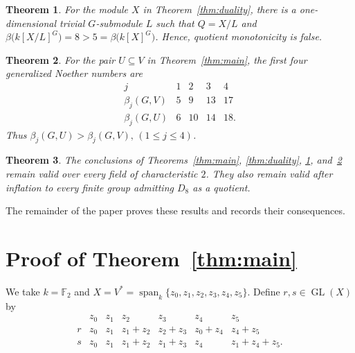 \documentclass[11pt]{article}
\newtheorem{theorem}{Theorem}[section]
\theoremstyle{definition}
\newcommand{\F}{\mathbb F}
\newcommand{\GL}{\operatorname{GL}}
\newcommand{\Span}{\operatorname{span}}
\begin{document}
	\begin{theorem}\label{thm:quotient}
		For the module $X$ in Theorem~\ref{thm:duality}, there is a one-dimensional trivial $G$-submodule $L$ such that $Q=X/L$ and $\beta\bigl(k[X/L]^G\bigr)=8>5=\beta\bigl(k[X]^G\bigr)$. Hence, quotient monotonicity is false.
	\end{theorem}

	\begin{theorem}\label{thm:generalized}
		For the pair $U\subseteq V$ in Theorem~\ref{thm:main}, the first four generalized Noether numbers are
		\[
		\begin{array}{c|cccc}
			j&1&2&3&4\\ \hline
			\beta_j(G,V)&5&9&13&17\\
			\beta_j(G,U)&6&10&14&18.
		\end{array}
		\]
		Thus $\beta_j(G,U)>\beta_j(G,V), \, (1\leq j\leq4)$.
	\end{theorem}

	\begin{theorem}\label{thm:inflation}
		The conclusions of Theorems~\ref{thm:main}, \ref{thm:duality}, \ref{thm:quotient}, and~\ref{thm:generalized} remain valid over every field of characteristic $2$. They also remain valid after inflation to every finite group admitting $D_8$ as a quotient.
	\end{theorem}

	The remainder of the paper proves these results and records their consequences.

	\section{Proof of Theorem~\ref{thm:main}}
	
	We take $k=\F_2$ and $X=V^*=\Span_k\{z_0,z_1,z_2,z_3,z_4,z_5\}$. Define $r,s\in\GL(X)$ by
	\begin{equation}\label{eq:X-action-table}
		\begin{array}{c|cccccc}
			&z_0&z_1&z_2&z_3&z_4&z_5\\ \hline
			r&z_0&z_1&z_1+z_2&z_2+z_3&z_0+z_4&z_4+z_5\\[1mm]
			s&z_0&z_1&z_1+z_2&z_1+z_3&z_4&z_1+z_4+z_5.
		\end{array}
	\end{equation}
	
\end{document}
